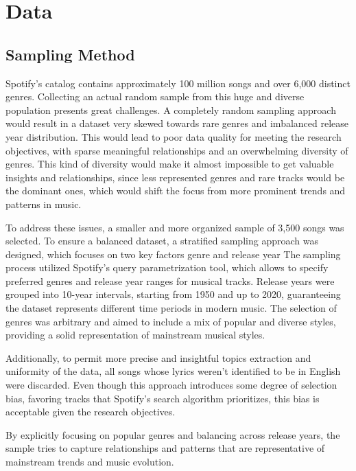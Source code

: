 \chapter{Data}
\label{cha:data}



\section{Sampling Method}
\label{sec:samplingmethod}

Spotify’s catalog contains approximately 100 million songs and over 6,000 distinct genres.
Collecting an actual random sample from this huge and diverse population presents great
challenges. A completely random sampling approach would result in a dataset very
skewed towards rare genres and imbalanced release year distribution. This would lead to
poor data quality for meeting the research objectives, with sparse meaningful relationships
and an overwhelming diversity of genres. \textbf{}
This kind of diversity would make it almost impossible to get valuable insights and relationships, since less represented genres and rare tracks would be the dominant ones, which would shift the focus from more prominent trends and patterns in music.


To address these issues, a smaller and more organized sample of 3,500 songs was
selected. To ensure a balanced dataset, a stratified sampling approach was designed, which focuses on two key factors genre and release year The sampling process utilized Spotify’s query parametrization tool, which allows to specify preferred genres and release
year ranges for musical tracks. Release years were grouped into 10-year intervals, starting
from 1950 and up to 2020, guaranteeing the dataset represents different time periods in
modern music. The selection of genres was arbitrary and aimed to include a mix of popular
and diverse styles, providing a solid representation of mainstream musical styles.


Additionally, to permit more precise and insightful topics extraction and uniformity of the data, all songs whose lyrics weren’t identified to be in English were discarded.
Even though this approach introduces some degree of selection bias, favoring tracks that
Spotify’s search algorithm prioritizes, this bias is acceptable given the research objectives.


By explicitly focusing on popular genres and balancing across release years, the sample tries
to capture relationships and patterns that are representative of mainstream trends and music
evolution.

